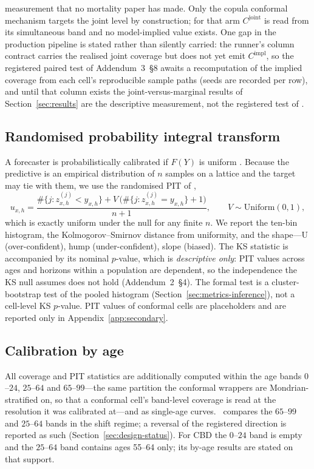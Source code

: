 measurement that no mortality paper has made. Only the copula conformal
mechanism targets the joint level by construction; for that arm
$C^{\mathrm{joint}}$ is read from its simultaneous band and no
model-implied value exists. One gap in the production pipeline is stated
rather than silently carried: the runner's column contract carries the
realised joint coverage but does not yet emit $C^{\mathrm{impl}}$, so the
registered paired test of Addendum~3~\S8 awaits a recomputation of the
implied coverage from each cell's reproducible sample paths (seeds are
recorded per row), and until that column exists the joint-versus-marginal
results of Section~\ref{sec:results} are the descriptive measurement, not
the registered test of \Hthree.

\subsection{Randomised probability integral transform}

A forecaster is probabilistically calibrated if $F(Y)$ is uniform
\citep{gneiting2007probabilistic,dawid1984present}. Because the predictive is
an empirical distribution of $n$ samples on a lattice and the target may
tie with them, we use the randomised PIT of \citet{czado2009predictive},
\begin{equation}
  u_{x,h} = \frac{\#\{j: z^{(j)}_{x,h} < y_{x,h}\} + V\,\big(\#\{j: z^{(j)}_{x,h}=y_{x,h}\}+1\big)}{n+1},
  \qquad V\sim\mathrm{Uniform}(0,1),
\end{equation}
which is exactly uniform under the null for any finite $n$. We report the
ten-bin histogram, the Kolmogorov--Smirnov distance from uniformity, and the
shape---U (over-confident), hump (under-confident), slope (biased). The KS
statistic is accompanied by its nominal $p$-value, which is
\emph{descriptive only}: PIT values across ages and horizons within a
population are dependent, so the independence the KS null assumes does not
hold (Addendum~2~\S4). The formal test is a cluster-bootstrap test of the
pooled histogram (Section~\ref{sec:metrics-inference}), not a cell-level KS
$p$-value. PIT values of conformal cells are placeholders and are reported
only in Appendix~\ref{app:secondary}.

\subsection{Calibration by age}

All coverage and PIT statistics are additionally computed within the age
bands $0$--$24$, $25$--$64$ and $65$--$99$---the same partition the
conformal wrappers are Mondrian-stratified on, so that a conformal cell's
band-level coverage is read at the resolution it was calibrated at---and
as single-age curves. \Hfour\ compares the $65$--$99$ and $25$--$64$ bands
in the shift regime; a reversal of the registered direction is reported as
such (Section~\ref{sec:design-status}). For CBD the $0$--$24$ band is empty
and the $25$--$64$ band contains ages 55--64 only; its by-age results are
stated on that support.

